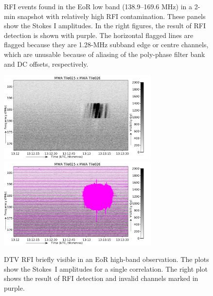 \documentclass{pasa}
\begin{document}
\begin{figure}
{\label{fig:150_2}
}%
\caption{RFI events found in the EoR low band (138.9--169.6 MHz) in a 2-min snapshot with relatively high RFI contamination. These panels show the Stokes I amplitudes. In the right figures, the result of RFI detection is shown with purple. The horizontal flagged lines are flagged because they are 1.28-MHz subband edge or centre channels, which are unusable because of aliasing of the poly-phase filter bank and DC offsets, respectively.}
\label{fig:2m-amateur-band}
\end{figure}

\noindent\begin{figure}%
\begin{center}\hspace*{-0.2cm}\includegraphics[width=8cm]{img/EoR-high-band-DVB-burst-example-noflags}\includegraphics[width=8cm]{img/EoR-high-band-DVB-burst-example-withflags}
\end{center}
\caption{DTV RFI briefly visible in an EoR high-band observation. The plots show the Stokes~I amplitudes for a single correlation. The right plot shows the result of RFI detection and invalid channels marked in purple.}
\label{fig:dvb-burst}
\end{figure}
\end{document}
